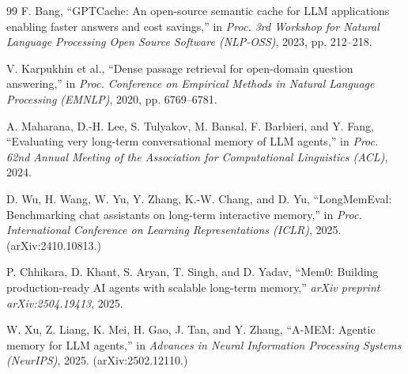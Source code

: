 \documentclass[conference]{IEEEtran}
\begin{document}
\begin{thebibliography}{99}
F. Bang, ``GPTCache: An open-source semantic cache for LLM applications enabling faster answers and cost savings,'' in \textit{Proc. 3rd Workshop for Natural Language Processing Open Source Software (NLP-OSS)}, 2023, pp. 212--218.

V. Karpukhin et al., ``Dense passage retrieval for open-domain question answering,'' in \textit{Proc. Conference on Empirical Methods in Natural Language Processing (EMNLP)}, 2020, pp. 6769--6781.

A. Maharana, D.-H. Lee, S. Tulyakov, M. Bansal, F. Barbieri, and Y. Fang, ``Evaluating very long-term conversational memory of LLM agents,'' in \textit{Proc. 62nd Annual Meeting of the Association for Computational Linguistics (ACL)}, 2024.

D. Wu, H. Wang, W. Yu, Y. Zhang, K.-W. Chang, and D. Yu, ``LongMemEval: Benchmarking chat assistants on long-term interactive memory,'' in \textit{Proc. International Conference on Learning Representations (ICLR)}, 2025. (arXiv:2410.10813.)

P. Chhikara, D. Khant, S. Aryan, T. Singh, and D. Yadav, ``Mem0: Building production-ready AI agents with scalable long-term memory,'' \textit{arXiv preprint arXiv:2504.19413}, 2025.

W. Xu, Z. Liang, K. Mei, H. Gao, J. Tan, and Y. Zhang, ``A-MEM: Agentic memory for LLM agents,'' in \textit{Advances in Neural Information Processing Systems (NeurIPS)}, 2025. (arXiv:2502.12110.)

\end{thebibliography}
\end{document}
